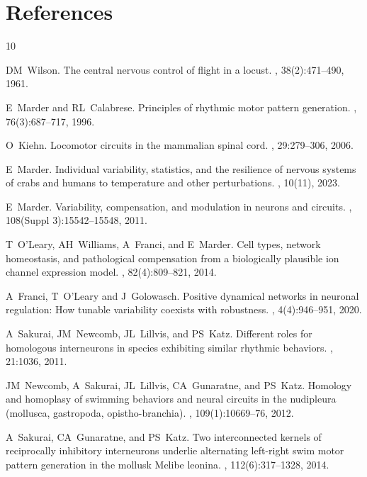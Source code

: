 \documentclass[nofootinbib,aip,amsmath,amssymb,preprint,twocolumn,floatfix,10pt]{revtex4-2}
\begin{document}
\section*{References}
\begin{thebibliography}{10}

  
DM~Wilson.
\newblock The central nervous control of flight in a locust.
, 38(2):471--490, 1961.

E~Marder and RL~Calabrese.
\newblock Principles of rhythmic motor pattern generation.
, {76}({3}):687--717, {1996}.

O~Kiehn.
\newblock Locomotor circuits in the mammalian spinal cord.
, 29:279--306, 2006.

E~Marder.
\newblock Individual variability, statistics, and the resilience of nervous systems of crabs and humans to temperature and other perturbations.
, 10(11), 2023.

E~Marder.
\newblock Variability, compensation, and modulation in neurons and circuits.
, 108(Suppl 3):15542--15548, 2011.

T~O'Leary, AH~Williams, A~Franci, and E~Marder.
\newblock Cell types, network homeostasis, and pathological compensation from a biologically plausible ion channel expression model.
, 82(4):809--821, 2014.

A~Franci, T~O'Leary  and J~Golowasch.
\newblock Positive dynamical networks in neuronal regulation: How tunable variability coexists with robustness.
, 4(4):946--951, 2020.


A~Sakurai, JM~Newcomb, JL~Lillvis, and PS~Katz.
\newblock Different roles for homologous interneurons in species exhibiting
  similar rhythmic behaviors.
, 21:1036, 2011.

JM~Newcomb, A~Sakurai, JL~Lillvis, CA~Gunaratne, and PS~Katz.
\newblock Homology and homoplasy of swimming behaviors and neural circuits in
  the nudipleura (mollusca, gastropoda, 
  opistho-branchia).
, 109(1):10669--76, 2012.

A~Sakurai, CA~Gunaratne, and PS~Katz.
\newblock Two interconnected kernels of reciprocally inhibitory interneurons
  underlie alternating left-right swim motor pattern generation in the mollusk
  Melibe leonina.
, 112(6):317--1328, 2014.


\end{thebibliography}
\end{document}
